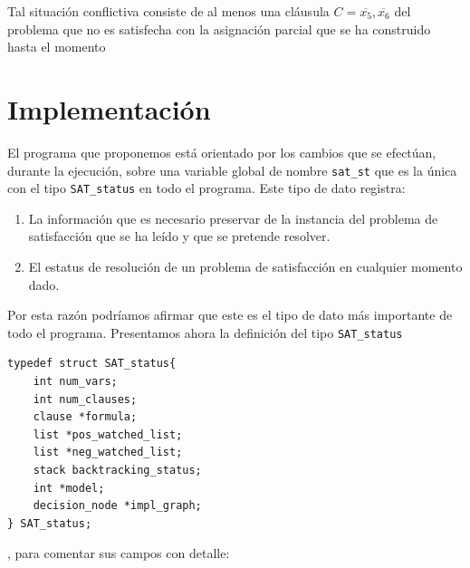 \documentclass[12pt,lettersize,oneside]{article}
\begin{document}
Tal situación conflictiva consiste de al menos una cláusula $C=
\overline{x_5},\overline{x_6}$ del problema que no es satisfecha con la
asignación parcial que se ha construido hasta el momento


\section{Implementación}

El programa que proponemos está orientado por los cambios que se efectúan,
durante la ejecución, sobre una variable global de nombre {\tt sat\_st} que es la
única con el tipo {\tt SAT\_status} en todo el programa. 
Este tipo de dato registra: \vspace{-4.5mm}
\begin{enumerate}
\item La información que es necesario preservar de la instancia del problema de
  satisfacción que se ha leído y que se pretende resolver.
\item El estatus de resolución de un problema de satisfacción en cualquier
  momento dado.
\end{enumerate}
Por esta razón podríamos afirmar que este es el tipo de dato más importante de
todo el programa.
Presentamos ahora la definición del tipo {\tt SAT\_status}
\begin{lstlisting}
typedef struct SAT_status{    
    int num_vars;
    int num_clauses;
    clause *formula;
    list *pos_watched_list;
    list *neg_watched_list;
    stack backtracking_status;
    int *model;
    decision_node *impl_graph;                     
} SAT_status;
\end{lstlisting}
, para comentar sus campos con detalle:\vspace{-2.5mm}
\end{document}
